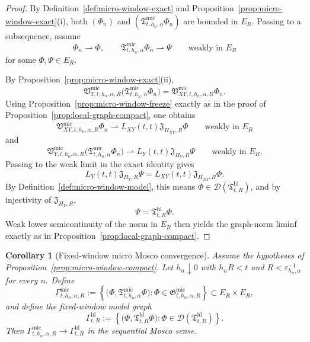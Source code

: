 \documentclass[11pt,a4paper]{amsart}
\theoremstyle{plain}
\newtheorem{corollary}[theorem]{Corollary}
\theoremstyle{definition}
\theoremstyle{remark}
\begin{document}
\begin{proof}
By Definition~\ref{def:micro-window-exact} and Proposition~\ref{prop:micro-window-exact}(i), both
\((\Phi_n)\) and \((\mathfrak T_{t,h_n,\alpha}^{\mathrm{mic}}\Phi_n)\) are bounded in \(E_R\).
Passing to a subsequence, assume
\[
\Phi_n\rightharpoonup \Phi,
\qquad
\mathfrak T_{t,h_n,\alpha}^{\mathrm{mic}}\Phi_n\rightharpoonup \Psi
\qquad\text{weakly in }E_R
\]
for some \(\Phi,\Psi\in E_R\).

By Proposition~\ref{prop:micro-window-exact}(ii),
\[
\mathfrak V_{Y,t,h_n,\alpha,R}^{\mathrm{mic}}
\bigl(
\mathfrak T_{t,h_n,\alpha}^{\mathrm{mic}}\Phi_n
\bigr)
=
\mathfrak V_{XY,t,h_n,\alpha,R}^{\mathrm{mic}}\Phi_n.
\]
Using Proposition~\ref{prop:micro-window-freeze} exactly as in the proof of
Proposition~\ref{prop:local-graph-compact}, one obtains
\[
\mathfrak V_{XY,t,h_n,\alpha,R}^{\mathrm{mic}}\Phi_n
\rightharpoonup
L_{XY}(t,t)\mathfrak J_{H_{XY},R}\Phi
\qquad\text{weakly in }E_R
\]
and
\[
\mathfrak V_{Y,t,h_n,\alpha,R}^{\mathrm{mic}}
\bigl(
\mathfrak T_{t,h_n,\alpha}^{\mathrm{mic}}\Phi_n
\bigr)
\rightharpoonup
L_Y(t,t)\mathfrak J_{H_Y,R}\Psi
\qquad\text{weakly in }E_R.
\]
Passing to the weak limit in the exact identity gives
\[
L_Y(t,t)\mathfrak J_{H_Y,R}\Psi
=
L_{XY}(t,t)\mathfrak J_{H_{XY},R}\Phi.
\]
By Definition~\ref{def:micro-window-model}, this means \(\Phi\in\mathcal D(\mathfrak T_{t,R}^{\mathrm{hl}})\),
and by injectivity of \(\mathfrak J_{H_Y,R}\),
\[
\Psi=\mathfrak T_{t,R}^{\mathrm{hl}}\Phi.
\]
Weak lower semicontinuity of the norm in \(E_R\) then yields the graph-norm liminf exactly as in
Proposition~\ref{prop:local-graph-compact}.
\end{proof}

\begin{corollary}[Fixed-window micro Mosco convergence]
\label{cor:micro-window-mosco}
Assume the hypotheses of Proposition~\ref{prop:micro-window-compact}. Let \(h_n\downarrow0\) with
\(h_nR<t\) and \(R<\varepsilon_{h_n,\alpha}^{-1}\) for every \(n\). Define
\[
\Gamma_{t,h_n,\alpha,R}^{\mathrm{mic}}
:=
\left\{
\bigl(
\Phi,\mathfrak T_{t,h_n,\alpha}^{\mathrm{mic}}\Phi
\bigr):
\Phi\in\mathfrak G_{t,h_n,\alpha,R}^{\mathrm{mic}}
\right\}
\subset E_R\times E_R,
\]
and define the fixed-window model graph
\[
\Gamma_{t,R}^{\mathrm{hl}}
:=
\left\{
\bigl(
\Phi,\mathfrak T_{t,R}^{\mathrm{hl}}\Phi
\bigr):
\Phi\in \mathcal D(\mathfrak T_{t,R}^{\mathrm{hl}})
\right\}.
\]
Then \(\Gamma_{t,h_n,\alpha,R}^{\mathrm{mic}}\to \Gamma_{t,R}^{\mathrm{hl}}\) in the sequential Mosco
sense.
\end{corollary}
\end{document}
